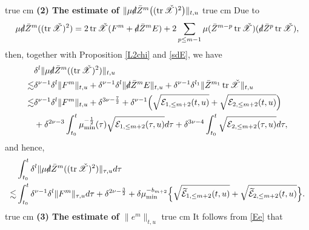\documentclass[11pt,twoside]{article}
\def\f{\frac}
\begin{document}
 true cm
{\bfseries (2) The estimate of $\|\mu\slashed d\bar Z^m\bigl((\operatorname{tr}\check{\mathscr{X}})^2\bigr)\|_{t,u}$}
 true cm
Due to
\[
\mu\slashed d\bar Z^m((\operatorname{tr}\check{\mathscr{X}})^2)
=2\operatorname{tr}\check{\mathscr{X}}(F^m+\slashed d\bar Z^m E)+2\sum_{p\leq m-1}\mu(\bar Z^{m-p}\operatorname{tr}\check{\mathscr{X}})(\slashed d\bar Z^p\operatorname{tr}\check{\mathscr{X}}),
\]
then, together with Proposition \ref{L2chi} and \eqref{sdE}, we have
\begin{equation*}
\begin{split}
&\delta^l\|\mu\slashed d\bar Z^m((\operatorname{tr}\check{\mathscr{X}})^2)\|_{t,u}\\
\lesssim&\delta^{\nu-1}\delta^l\|F^m\|_{t,u}+\delta^{\nu-1}\delta^l\|\slashed d\bar Z^m E\|_{t,u}+\delta^{\nu-1}\delta^{l_1}\|\bar Z^{m_1}\operatorname{tr}\check{\mathscr{X}}\|_{t,u}\\
\lesssim&\delta^{\nu-1}\delta^l\|F^m\|_{t,u}+\delta^{3\nu-\f72}+\delta^{\nu-1}\Big(\sqrt{\mathcal E_{1,\leq m+2}(t,u)}+\sqrt{\mathcal E_{2,\leq m+2}(t,u)}\Big)\\
&+\delta^{2\nu-3}\int_{t_0}^t\mu_{\min}^{-\f12}(\tau)\sqrt{\mathcal E_{1,\leq m+2}(\tau,u)}d\tau+\delta^{3\nu-4}\int_{t_0}^t\sqrt{\mathcal E_{2,\leq m+2}(\tau,u)}d\tau,
\end{split}
\end{equation*}
and hence,
\begin{equation}\label{Y-19}
\begin{split}
&\int_{t_0}^t\delta^l\|\mu\slashed d\bar Z^m((\operatorname{tr}\check{\mathscr{X}})^2)\|_{\tau,u}d\tau\\
\lesssim & \int_{t_0}^t\delta^{\nu-1}\delta^l\|F^m\|_{\tau,u}d\tau+\delta^{2\nu-\f32}+\delta\mu_{\min}^{-b_{m+2}}\Big\{\sqrt{\widetilde{\mathcal{E}}_{1,\leq m+2}(t,u)}+\sqrt{\widetilde{\mathcal{E}}_{2,\leq m+2}(t,u)}\Big\}.
\end{split}
\end{equation}
 true cm
{\bfseries (3) The estimate of $\|e^m\|_{t,u}$}
 true cm
It follows from \eqref{Ee} that
\end{document}

